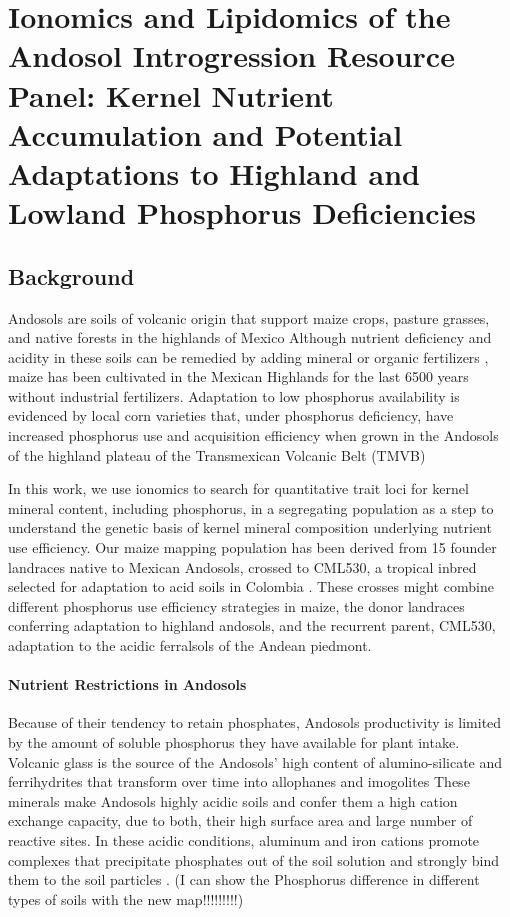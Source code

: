 \chapter{Ionomics and Lipidomics of the Andosol Introgression Resource Panel: Kernel Nutrient Accumulation and Potential Adaptations to Highland and Lowland Phosphorus Deficiencies}
\label{chap-three}

\newrefsection

\section{Background}
Andosols are soils of volcanic origin that support maize crops, pasture grasses, and native forests in the highlands of Mexico \citep{bayuelo-jimenez2020,galvan-tejada2014}
Although nutrient deficiency and acidity in these soils can be remedied by adding mineral or organic fertilizers \citep{nobile2020}, maize has been cultivated in the Mexican Highlands for the last 6500 years \citep{piperno2001} without industrial fertilizers.
Adaptation to low phosphorus availability is evidenced by local corn varieties that, under phosphorus deficiency, have increased phosphorus use and acquisition efficiency when grown in the Andosols of the highland plateau of the Transmexican Volcanic Belt (TMVB) \citep{bayuelo-jimenez2011,bayuelo-jimenez2014}

In this work, we use ionomics to search for quantitative trait loci for kernel mineral content, including phosphorus, in a segregating population as a step to understand the genetic basis of kernel mineral composition underlying nutrient use efficiency.
Our maize mapping population has been derived from 15 founder landraces native to Mexican Andosols, crossed to CML530, a tropical inbred selected for adaptation to acid soils in Colombia \citep{granados1995}.
These crosses might combine different phosphorus use efficiency strategies in maize, the donor landraces conferring adaptation to highland andosols, and the recurrent parent, CML530, adaptation to the acidic ferralsols of the Andean piedmont.

\subsubsection{Nutrient Restrictions in Andosols}

Because of their tendency to retain phosphates, Andosols productivity is limited by the amount of soluble phosphorus they have available for plant intake. Volcanic glass is the source of the Andosols’ high content of alumino-silicate and ferrihydrites that transform over time into allophanes and imogolites \citep{wrb2022}
These minerals make Andosols highly acidic soils and confer them a high cation exchange capacity, due to both, their high surface area and large number of reactive sites.
In these acidic conditions, aluminum and iron cations promote complexes that precipitate phosphates out of the soil solution and strongly bind them to the soil particles \citep{krasilnikov2013}.  (I can show the Phosphorus difference in different types of soils  with the new map!!!!!!!!!)

